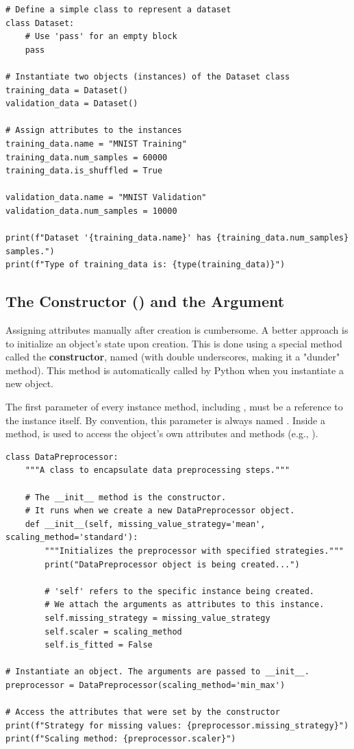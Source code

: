\text{ }\begin{verbatim}
# Define a simple class to represent a dataset
class Dataset:
    # Use 'pass' for an empty block
    pass

# Instantiate two objects (instances) of the Dataset class
training_data = Dataset()
validation_data = Dataset()

# Assign attributes to the instances
training_data.name = "MNIST Training"
training_data.num_samples = 60000
training_data.is_shuffled = True

validation_data.name = "MNIST Validation"
validation_data.num_samples = 10000

print(f"Dataset '{training_data.name}' has {training_data.num_samples} samples.")
print(f"Type of training_data is: {type(training_data)}")
\end{verbatim}

\subsection{The Constructor () and the  Argument}
\label{subsec:init_self}
Assigning attributes manually after creation is cumbersome. A better approach is to initialize an object's state upon creation. This is done using a special method called the \textbf{constructor}, named  (with double underscores, making it a "dunder" method). This method is automatically called by Python when you instantiate a new object.

The first parameter of every instance method, including , must be a reference to the instance itself. By convention, this parameter is always named \textbf{}. Inside a method,  is used to access the object's own attributes and methods (e.g., ).

\begin{example}
\text{ }\begin{verbatim}
class DataPreprocessor:
    """A class to encapsulate data preprocessing steps."""
    
    # The __init__ method is the constructor.
    # It runs when we create a new DataPreprocessor object.
    def __init__(self, missing_value_strategy='mean', scaling_method='standard'):
        """Initializes the preprocessor with specified strategies."""
        print("DataPreprocessor object is being created...")
        
        # 'self' refers to the specific instance being created.
        # We attach the arguments as attributes to this instance.
        self.missing_strategy = missing_value_strategy
        self.scaler = scaling_method
        self.is_fitted = False

# Instantiate an object. The arguments are passed to __init__.
preprocessor = DataPreprocessor(scaling_method='min_max')

# Access the attributes that were set by the constructor
print(f"Strategy for missing values: {preprocessor.missing_strategy}")
print(f"Scaling method: {preprocessor.scaler}")
\end{verbatim}
\end{example}

